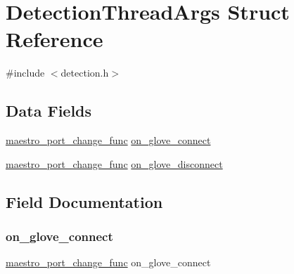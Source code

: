 \hypertarget{struct_detection_thread_args}{}\section{Detection\+Thread\+Args Struct Reference}
\label{struct_detection_thread_args}


{\ttfamily \#include $<$detection.\+h$>$}

\subsection*{Data Fields}
\begin{DoxyCompactItemize}
\item 
\hyperlink{detection_8h_a97acba48581134d2db93ead25c0e8c32}{maestro\+\_\+port\+\_\+change\+\_\+func} \hyperlink{struct_detection_thread_args_a73ab563710ec41d6070ff76e1ea8e953}{on\+\_\+glove\+\_\+connect}
\item 
\hyperlink{detection_8h_a97acba48581134d2db93ead25c0e8c32}{maestro\+\_\+port\+\_\+change\+\_\+func} \hyperlink{struct_detection_thread_args_a9a576d4ee4906826eccbcba499a1aeff}{on\+\_\+glove\+\_\+disconnect}
\end{DoxyCompactItemize}


\subsection{Field Documentation}
\mbox{\label{struct_detection_thread_args_a73ab563710ec41d6070ff76e1ea8e953}} 
\subsubsection{\texorpdfstring{on\+\_\+glove\+\_\+connect}{on\_glove\_connect}}
{\footnotesize\ttfamily \hyperlink{detection_8h_a97acba48581134d2db93ead25c0e8c32}{maestro\+\_\+port\+\_\+change\+\_\+func} on\+\_\+glove\+\_\+connect}

\mbox{\label{struct_detection_thread_args_a9a576d4ee4906826eccbcba499a1aeff}} 
